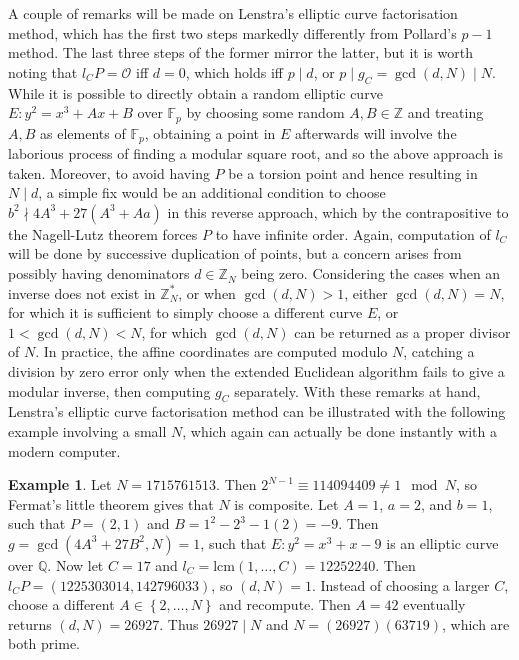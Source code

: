 \documentclass{article}
\newcommand{\F}{\mathbb{F}}
\newcommand{\Z}{\mathbb{Z}}
\newcommand{\Q}{\mathbb{Q}}
\newcommand{\rb}[1]{\left( #1 \right)}
\newcommand{\cb}[1]{\left\{ #1 \right\}}
\theoremstyle{definition}
\newtheorem*{example}{Example}
\begin{document}
A couple of remarks will be made on Lenstra's elliptic curve factorisation method, which has the first two steps markedly differently from Pollard's $ p - 1 $ method. The last three steps of the former mirror the latter, but it is worth noting that $ l_CP = \mathcal{O} $ iff $ d = 0 $, which holds iff $ p \mid d $, or $ p \mid g_C = \gcd\rb{d, N} \mid N $. While it is possible to directly obtain a random elliptic curve $ E : y^2 = x^3 + Ax + B $ over $ \F_p $ by choosing some random $ A, B \in \Z $ and treating $ A, B $ as elements of $ \F_p $, obtaining a point in $ E $ afterwards will involve the laborious process of finding a modular square root, and so the above approach is taken. Moreover, to avoid having $ P $ be a torsion point and hence resulting in $ N \mid d $, a simple fix would be an additional condition to choose $ b^2 \nmid 4A^3 + 27\rb{A^3 + Aa} $ in this reverse approach, which by the contrapositive to the Nagell-Lutz theorem forces $ P $ to have infinite order. Again, computation of $ l_C $ will be done by successive duplication of points, but a concern arises from possibly having denominators $ d \in \Z_N $ being zero. Considering the cases when an inverse does not exist in $ \Z_N^* $, or when $ \gcd\rb{d, N} > 1 $, either $ \gcd\rb{d, N} = N $, for which it is sufficient to simply choose a different curve $ E $, or $ 1 < \gcd\rb{d, N} < N $, for which $ \gcd\rb{d, N} $ can be returned as a proper divisor of $ N $. In practice, the affine coordinates are computed modulo $ N $, catching a division by zero error only when the extended Euclidean algorithm fails to give a modular inverse, then computing $ g_C $ separately. With these remarks at hand, Lenstra's elliptic curve factorisation method can be illustrated with the following example involving a small $ N $, which again can actually be done instantly with a modern computer.

\begin{example}
Let $ N = 1715761513 $. Then $ 2^{N - 1} \equiv 114094409 \ne 1 \mod N $, so Fermat's little theorem gives that $ N $ is composite. Let $ A = 1 $, $ a = 2 $, and $ b = 1 $, such that $ P = \rb{2, 1} $ and $ B = 1^2 - 2^3 - 1\rb{2} = -9 $. Then $ g = \gcd\rb{4A^3 + 27B^2, N} = 1 $, such that $ E : y^2 = x^3 + x - 9 $ is an elliptic curve over $ \Q $. Now let $ C = 17 $ and $ l_C = \text{lcm}\rb{1, \dots, C} = 12252240 $. Then $ l_CP = \rb{1225303014, 142796033} $, so $ \rb{d, N} = 1 $. Instead of choosing a larger $ C $, choose a different $ A \in \cb{2, \dots, N} $ and recompute. Then $ A = 42 $ eventually returns $ \rb{d, N} = 26927 $. Thus $ 26927 \mid N $ and $ N = \rb{26927}\rb{63719} $, which are both prime.
\end{example}
\end{document}
